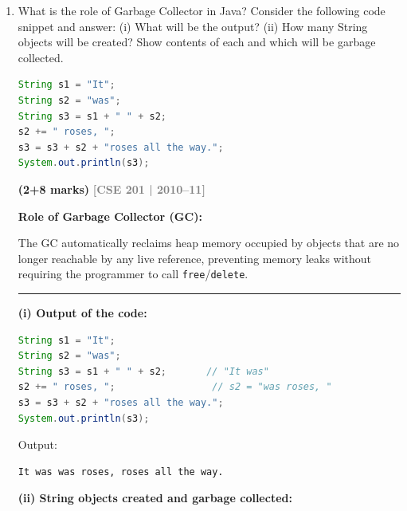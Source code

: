 \documentclass[12pt,a3paper]{article}
\newcommand{\yr}[1]{\hfill\textcolor{gray}{\small\textbf{[#1]}}}
\newcommand{\mk}[1]{\textcolor{orange!70!black}{\small\textbf{(#1 marks)}}}
\begin{document}
\begin{enumerate}
\begin{tcolorbox}
\textbf{Output:}
\begin{lstlisting}
0 0
0 0 0 0 0
0 0 0
\end{lstlisting}

\end{tcolorbox}

\item What is the role of Garbage Collector in Java? Consider the following code snippet and answer: (i) What will be the output? (ii) How many String objects will be created? Show contents of each and which will be garbage collected.
\begin{lstlisting}[language=Java]
String s1 = "It";
String s2 = "was";
String s3 = s1 + " " + s2;
s2 += " roses, ";
s3 = s3 + s2 + "roses all the way.";
System.out.println(s3);
\end{lstlisting}
\mk{2+8}
\yr{CSE 201 | 2010--11}

\begin{tcolorbox}[enhanced,breakable,ansbox,
  colback=cB!4,colframe=cB,boxrule=0.8pt,arc=5pt,
  title={\textbf{Answer --- Garbage Collector \& String Object Analysis}},
  fonttitle=\bfseries\color{white},colbacktitle=cB]

\textbf{Role of Garbage Collector (GC):}

The GC automatically reclaims heap memory occupied by objects that
are no longer reachable by any live reference, preventing memory
leaks without requiring the programmer to call \texttt{free}/\texttt{delete}.

\medskip
\textcolor{cC}{\rule{\textwidth}{0.4pt}}

\textbf{(i) Output of the code:}

\begin{lstlisting}[language=Java]
String s1 = "It";
String s2 = "was";
String s3 = s1 + " " + s2;       // "It was"
s2 += " roses, ";                 // s2 = "was roses, "
s3 = s3 + s2 + "roses all the way.";
System.out.println(s3);
\end{lstlisting}

Output:
\begin{lstlisting}
It was was roses, roses all the way.
\end{lstlisting}

\medskip
\textbf{(ii) String objects created and garbage collected:}


\end{tcolorbox}
\end{enumerate}
\end{document}
